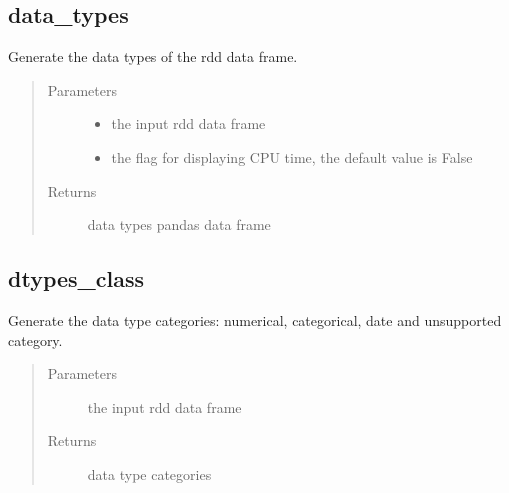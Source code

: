 \documentclass[letterpaper,12pt,english]{sphinxmanual}
\begin{document}
\subsection{data\_types}
\label{\detokenize{basics:data-types}}

\begin{fulllineitems}
Generate the data types of the rdd data frame.
\begin{quote}\begin{description}
\item[{Parameters}] \leavevmode\begin{itemize}
\item {} 
 \textendash{} the input rdd data frame

\item {} 
 \textendash{} the flag for displaying CPU time, the default value is False

\end{itemize}

\item[{Returns}] \leavevmode
data types pandas data frame

\end{description}\end{quote}

\end{fulllineitems}



\subsection{dtypes\_class}
\label{\detokenize{basics:dtypes-class}}

\begin{fulllineitems}
Generate the data type categories: numerical, categorical, date and unsupported category.
\begin{quote}\begin{description}
\item[{Parameters}] \leavevmode
{} \textendash{} the input rdd data frame

\item[{Returns}] \leavevmode
data type categories

\end{description}\end{quote}

\end{fulllineitems}
\end{document}
